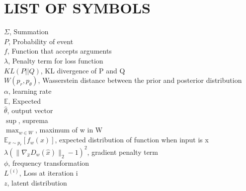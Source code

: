 \chapter*{LIST OF SYMBOLS}

\begin{flushleft}
$\Sigma$, Summation\\
\vspace{\baselineskip}
$P$, Probability of event\\
\vspace{\baselineskip}
$f$, Function that accepts arguments\\
\vspace{\baselineskip}
$\lambda$, Penalty term for loss function\\
\vspace{\baselineskip}
$KL(P||Q)$, KL divergence of P and Q\\
\vspace{\baselineskip}
$W(p_r, p_\theta)$, Wasserstein distance between the prior and posterior distribution\\
\vspace{\baselineskip}
$\alpha$, learning rate\\
\vspace{\baselineskip}
$\mathbb{E}$, Expected\\
\vspace{\baselineskip}
$\hat{\theta}$, output vector\\
\vspace{\baselineskip}
$\sup$, suprema \\
\vspace{\baselineskip}
$\max_{w \in W}$, maximum of w in W\\
\vspace{\baselineskip}
$\mathbb{E}_{x \sim p_r}[f_w(x)]$, expected distribution of function when input is x\\
\vspace{\baselineskip}
$\lambda(\|{\nabla_{\hat{x}} D_{w}(\hat{x})}\|_{2} - 1)^2$, gradient penalty term\\
\vspace{\baselineskip}
$\phi$, frequency transformation\\
\vspace{\baselineskip}
$L^{(i)}$, Loss at iteration i\\
\vspace{\baselineskip}
$z$, latent distribution\\
\vspace{\baselineskip}

\end{flushleft}
